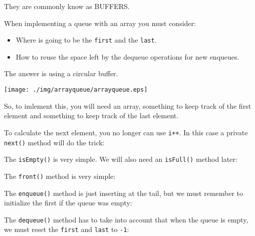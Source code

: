 \documentclass[a4paper, 9pt]{extarticle}
\begin{document}
They are commonly know as BUFFERS.

When implementing a queue with an array you must consider:

\begin{itemize}

  \item Where is going to be the \verb+first+ and the \verb+last+.

  \item How to reuse the space left by the dequeue operations for new enqueues.

\end{itemize}

The answer is using a circular buffer.

\begin{center}
  \texttt{[image: ./img/arrayqueue/arrayqueue.eps]}
\end{center}

So, to imlement this, you will need an array, something to keep track of the
first element and something to keep track of the last element.


To calculate the next element, you no longer can use \verb,i++,. In this case a
private \verb+next()+ method will do the trick:


The \verb+isEmpty()+ is very simple. We will also need an \verb+isFull()+
method later:


The \verb+front()+ method is very simple:


The \verb+enqueue()+ method is just inserting at the tail, but we must remember
to initialize the first if the queue was empty:


The \verb+dequeue()+ method has to take into account that when the queue is
empty, we must reset the \verb+first+ and \verb+last+ to \verb+-1+:

\end{document}
